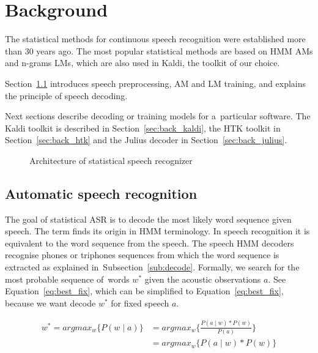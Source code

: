 \chapter{Background}
\label{cha:background}

The statistical methods for continuous speech recognition were established more than 30 years ago. 
The most popular statistical methods are based on \ac{HMM} \aclp{AM} and n-grams \acp{LM}, which are also used in Kaldi, the toolkit of our choice.

Section~\ref{sec:back_asr} introduces speech preprocessing, \ac{AM} and \ac{LM} training, and explains the principle of speech decoding.

Next sections describe decoding or training models for a~particular software.
The Kaldi toolkit is described in Section~\ref{sec:back_kaldi}, the \ac{HTK} toolkit in Section~\ref{sec:back_htk} and the Julius decoder in Section~\ref{sec:back_julius}.

\begin{figure}[!htp]
    \begin{center}
    
    \caption{Architecture of statistical speech recognizer\cite{ney1990acoustic}}
    \label{fig:components} 
    \end{center}
\end{figure}

\section{Automatic speech recognition}
\label{sec:back_asr}

The goal of statistical \ac{ASR} is to decode the most likely word sequence given speech.
The term  finds its origin in \acs{HMM} terminology. 
In speech recognition it is equivalent to  the word sequence from the speech. 
The speech \ac{HMM} decoders recognise phones or triphones sequences from which the word sequence is extracted as explained in~Subsection~\ref{sub:decode}.
Formally, we search for the most probable sequence of~words $w^*$ given the acoustic observations $a$.
See Equation~\ref{eq:best_fix}, which can be simplified to Equation~\ref{eq:best_fix}, because we want decode $w^*$ for fixed speech $a$.

\begin{equation}\label{eq:best_fix}
    \begin{split}
    w^* = argmax_{w}\{P(w \mid a)\} &= argmax_{w}\{\frac{P(a \mid w) * P(w)}{P(a)}\} \\
                                    &= argmax_{w}\{P(a \mid w) * P(w)\}
    \end{split}
\end{equation}

